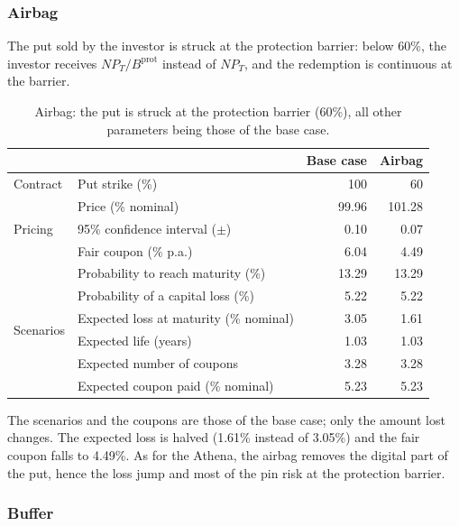 \documentclass[11pt,a4paper]{article}
\begin{document}
\clearpage
\subsubsection{Airbag}

The put sold by the investor is struck at the protection barrier: below 60\%, the investor receives
$N P_T / B^{\mathrm{prot}}$ instead of $N P_T$, and the redemption is continuous at the barrier.

\begin{table}[htbp]
  \centering
  \small
  \begin{tabular}{llrr}
    \toprule
     & & \textbf{Base case} & \textbf{Airbag} \\
    \midrule
    \multirow{1}{*}{Contract}
      & Put strike (\%) & 100 & 60 \\
    \midrule
    \multirow{3}{*}{Pricing}
      & Price (\% nominal) & 99.96 & 101.28 \\
      & 95\% confidence interval ($\pm$) & 0.10 & 0.07 \\
      & Fair coupon (\% p.a.) & 6.04 & 4.49 \\
    \midrule
    \multirow{6}{*}{Scenarios}
      & Probability to reach maturity (\%) & 13.29 & 13.29 \\
      & Probability of a capital loss (\%) & 5.22 & 5.22 \\
      & Expected loss at maturity (\% nominal) & 3.05 & 1.61 \\
      & Expected life (years) & 1.03 & 1.03 \\
      & Expected number of coupons & 3.28 & 3.28 \\
      & Expected coupon paid (\% nominal) & 5.23 & 5.23 \\
    \bottomrule
  \end{tabular}
  \caption{Airbag: the put is struck at the protection barrier (60\%), all other parameters being those of the base case.}
  \label{tab:phoenix-airbag}
\end{table}

The scenarios and the coupons are those of the base case; only the amount lost changes. The expected loss is halved
(1.61\% instead of 3.05\%) and the fair coupon falls to 4.49\%. As for the Athena, the airbag removes the digital part
of the put, hence the loss jump and most of the pin risk at the protection barrier.

\clearpage
\subsubsection{Buffer}
\end{document}
